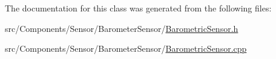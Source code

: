 The documentation for this class was generated from the following files\+:\begin{DoxyCompactItemize}
\item 
src/\+Components/\+Sensor/\+Barometer\+Sensor/\hyperlink{BarometricSensor_8h}{Barometric\+Sensor.\+h}\item 
src/\+Components/\+Sensor/\+Barometer\+Sensor/\hyperlink{BarometricSensor_8cpp}{Barometric\+Sensor.\+cpp}\end{DoxyCompactItemize}
